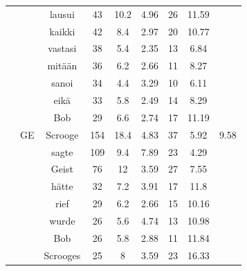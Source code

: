 \documentclass[shortpaper]{revdetua}
\begin{document}
\begin{table}[H]
\begin{tabular}{@{}ccccccccc@{}}
     & \multicolumn{1}{l|}{}   & lausui      & 43           & 10.2         & 4.96    & 26      & 11.59             &              \\ 
     & \multicolumn{1}{l|}{}   & kaikki      & 42           & 8.4          & 2.97    & 20      & 10.77             &              \\
     & \multicolumn{1}{l|}{}   & vastasi     & 38           & 5.4          & 2.35    & 13      & 6.84              &              \\
     & \multicolumn{1}{l|}{}   & mitään      & 36           & 6.2          & 2.66    & 11      & 8.27              &              \\
     & \multicolumn{1}{l|}{}   & sanoi       & 34           & 4.4          & 3.29    & 10      & 6.11              &              \\
     & \multicolumn{1}{l|}{}   & eikä        & 33           & 5.8          & 2.49    & 14      & 8.29              &              \\
     & \multicolumn{1}{l|}{}   & Bob         & 29           & 6.6          & 2.74    & 17      & 11.19             &              \\ \cmidrule(l){2-9} 
     & \multicolumn{1}{l|}{GE} & Scrooge     & 154          & 18.4         & 4.83    & 37      & 5.92              & 9.58         \\
     & \multicolumn{1}{l|}{}   & sagte       & 109          & 9.4          & 7.89    & 23      & 4.29              &              \\
     & \multicolumn{1}{l|}{}   & Geist       & 76           & 12           & 3.59    & 27      & 7.55              &              \\
     & \multicolumn{1}{l|}{}   & hätte       & 32           & 7.2          & 3.91    & 17      & 11.8              &              \\
     & \multicolumn{1}{l|}{}   & rief        & 29           & 6.2          & 2.66    & 15      & 10.16             &              \\
     & \multicolumn{1}{l|}{}   & wurde       & 26           & 5.6          & 4.74    & 13      & 10.98             &              \\
     & \multicolumn{1}{l|}{}   & Bob         & 26           & 5.8          & 2.88    & 11      & 11.84             &              \\
     & \multicolumn{1}{l|}{}   & Scrooges    & 25           & 8            & 3.59    & 23      & 16.33             &              \\

\end{tabular}
\end{table}
\end{document}
